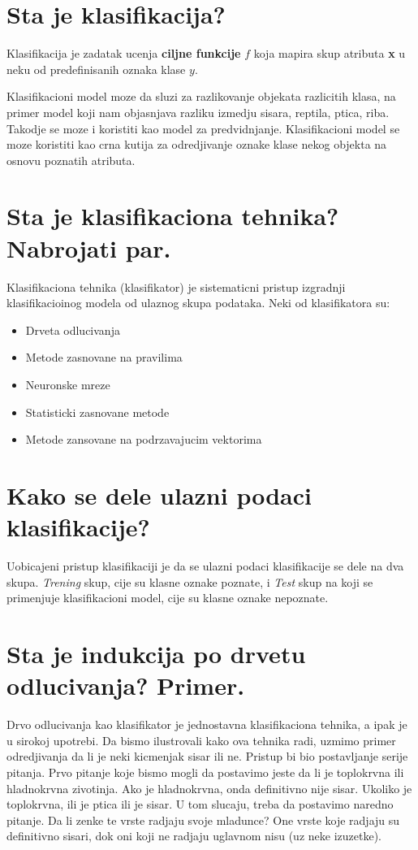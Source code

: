 \documentclass[a4paper]{article}
\begin{document}
\section{Sta je klasifikacija?}
Klasifikacija je zadatak ucenja \textbf{ciljne funkcije} \(f\) koja mapira skup atributa \textbf{x}
u neku od predefinisanih oznaka klase \(y\).

Klasifikacioni model moze da sluzi za razlikovanje objekata razlicitih klasa, na primer model koji
nam objasnjava razliku izmedju sisara, reptila, ptica, riba. Takodje se moze i koristiti kao model
za predvidnjanje. Klasifikacioni model se moze koristiti kao crna kutija za odredjivanje oznake
klase nekog objekta na osnovu poznatih atributa.

\section{Sta je klasifikaciona tehnika? Nabrojati par.}
Klasifikaciona tehnika (klasifikator) je sistematicni pristup izgradnji klasifikacioinog modela od
ulaznog skupa podataka. Neki od klasifikatora su:
\begin{itemize}
    \item Drveta odlucivanja
    \item Metode zasnovane na pravilima
    \item Neuronske mreze
    \item Statisticki zasnovane metode
    \item Metode zansovane na podrzavajucim vektorima
\end{itemize}

\section{Kako se dele ulazni podaci klasifikacije?}
Uobicajeni pristup klasifikaciji je da se ulazni podaci klasifikacije se dele na dva skupa.
\emph{Trening} skup, cije su klasne oznake poznate, i \emph{Test} skup na koji se primenjuje
klasifikacioni model, cije su klasne oznake nepoznate.

\section{Sta je indukcija po drvetu odlucivanja? Primer.}
Drvo odlucivanja kao klasifikator je jednostavna klasifikaciona tehnika, a ipak je u sirokoj
upotrebi. Da bismo ilustrovali kako ova tehnika radi, uzmimo primer odredjivanja da li je neki
kicmenjak sisar ili ne. Pristup bi bio postavljanje serije pitanja. Prvo pitanje koje bismo mogli da
postavimo jeste da li je toplokrvna ili hladnokrvna zivotinja. Ako je hladnokrvna, onda definitivno
nije sisar. Ukoliko je toplokrvna, ili je ptica ili je sisar. U tom slucaju, treba da postavimo
naredno pitanje. Da li zenke te vrste radjaju svoje mladunce? One vrste koje radjaju su definitivno
sisari, dok oni koji ne radjaju uglavnom nisu (uz neke izuzetke).
\end{document}
